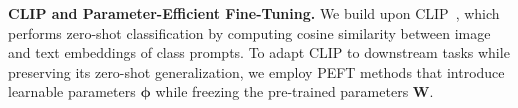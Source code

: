 \documentclass[10pt,twocolumn,letterpaper]{article}
\begin{document}
\noindent\textbf{CLIP and Parameter-Efficient Fine-Tuning.} We build upon CLIP~\cite{clip}, which performs zero-shot classification by computing cosine similarity between image and text embeddings of class prompts. To adapt CLIP to downstream tasks while preserving its zero-shot generalization, we employ PEFT methods that introduce learnable parameters $\boldsymbol{\phi}$ while freezing the pre-trained parameters $\boldsymbol{W}$.





\end{document}
